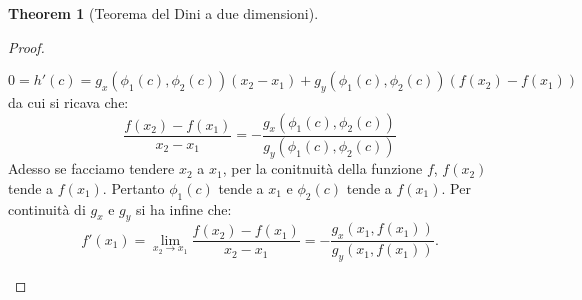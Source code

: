 \documentclass[leqno]{article}
\theoremstyle{definition}
\numberwithin{equation}{section}
\newtheorem{theorem}{Theorem}[section]
\theoremstyle{remark}
\begin{document}
\begin{theorem}[Teorema del Dini a due dimensioni]
\begin{proof}
\begin{description}
				\begin{equation}
					0=h'(c)=g_x(\phi_1(c),\phi_2(c))(x_2-x_1)+g_y(\phi_1(c),\phi_2(c))(f(x_2)-f(x_1))
				\end{equation}
				da cui si ricava che:
				\begin{equation}
					\dfrac{f(x_2)-f(x_1)}{x_2-x_1}=-\dfrac{g_x(\phi_1(c),\phi_2(c))}{g_y(\phi_1(c),\phi_2(c))}
				\end{equation}
				Adesso se facciamo tendere $x_2$ a $x_1$, per la conitnuità della funzione $f$, $f(x_2)$ tende a $f(x_1)$. Pertanto $\phi_1(c)$ tende a $x_1$ e $\phi_2(c)$ tende a $f(x_1)$. Per continuità di $g_x$ e $g_y$ si ha infine che:
				\begin{equation}
					f'(x_1)=\lim_{x_2\to x_1}\dfrac{f(x_2)-f(x_1)}{x_2-x_1}=-\dfrac{g_x(x_1,f(x_1))}{g_y(x_1,f(x_1))}.
				\end{equation}
			\end{description}
		\end{proof}
	\end{theorem}
	
\end{document}
